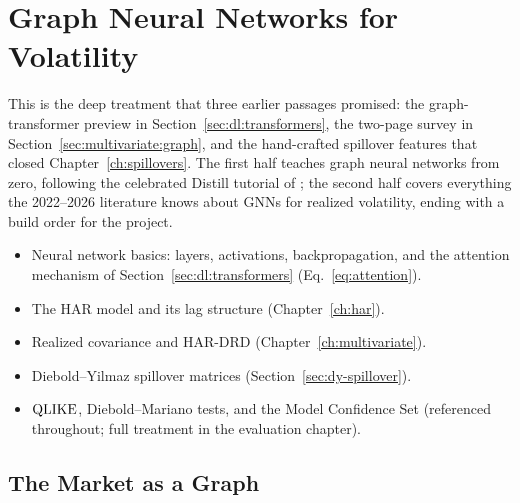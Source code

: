 
\chapter{Graph Neural Networks for Volatility}\label{ch:gnn}

\begin{application}
This is the deep treatment that three earlier passages promised: the graph-transformer preview in Section~\ref{sec:dl:transformers}, the two-page survey in Section~\ref{sec:multivariate:graph}, and the hand-crafted spillover features that closed Chapter~\ref{ch:spillovers}. The first half teaches graph neural networks from zero, following the celebrated Distill tutorial of \citet{SanchezLengeling2021}; the second half covers everything the 2022--2026 literature knows about GNNs for realized volatility, ending with a build order for the project.
\end{application}

\begin{prereq}
\begin{itemize}[nosep]
  \item Neural network basics: layers, activations, backpropagation, and the attention mechanism of Section~\ref{sec:dl:transformers} (Eq.~\ref{eq:attention}).
  \item The HAR model and its lag structure (Chapter~\ref{ch:har}).
  \item Realized covariance and HAR-DRD (Chapter~\ref{ch:multivariate}).
  \item Diebold--Yilmaz spillover matrices (Section~\ref{sec:dy-spillover}).
  \item $\operatorname{QLIKE}$, Diebold--Mariano tests, and the Model Confidence Set (referenced throughout; full treatment in the evaluation chapter).
\end{itemize}
\end{prereq}

\section{The Market as a Graph}\label{sec:gnn:market-graph}

